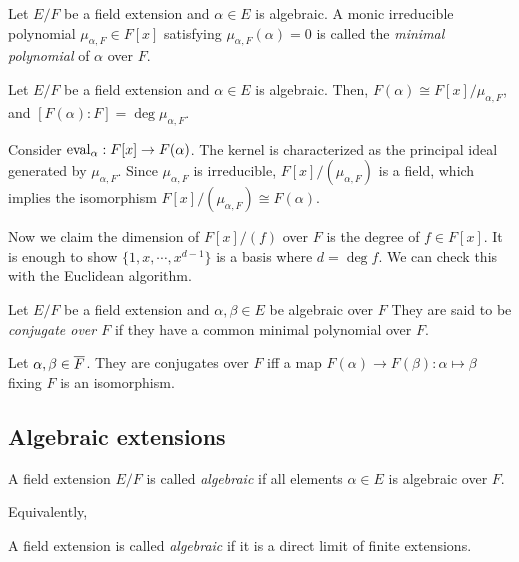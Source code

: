 \documentclass{../exp}
\begin{document}
\begin{defn}
Let $E/F$ be a field extension and $\alpha\in E$ is algebraic.
A monic irreducible polynomial $\mu_{\alpha,F}\in F[x]$ satisfying $\mu_{\alpha,F}(\alpha)=0$ is called the \emph{minimal polynomial} of $\alpha$ over $F$.
\end{defn}

\begin{thm}
Let $E/F$ be a field extension and $\alpha\in E$ is algebraic.
Then, $F(\alpha)\cong F[x]/\mu_{\alpha,F}$, and $[F(\alpha):F]=\deg\mu_{\alpha,F}$.
\end{thm}
\begin{pf}
Consider $\eval_\alpha:F[x]\to F(\alpha)$.
The kernel is characterized as the principal ideal generated by $\mu_{\alpha,F}$.
Since $\mu_{\alpha,F}$ is irreducible, $F[x]/(\mu_{\alpha,F})$ is a field, which implies the isomorphism $F[x]/(\mu_{\alpha,F})\cong F(\alpha)$.

Now we claim the dimension of $F[x]/(f)$ over $F$ is the degree of $f\in F[x]$.
It is enough to show $\{1,x,\cdots,x^{d-1}\}$ is a basis where $d=\deg f$.
We can check this with the Euclidean algorithm.
\end{pf}


\begin{defn}
Let $E/F$ be a field extension and $\alpha,\beta\in E$ be algebraic over $F$
They are said to be \emph{conjugate over $F$} if they have a common minimal polynomial over $F$.
\end{defn}

\begin{thm}
Let  $\alpha,\beta\in\overline F$.
They are conjugates over $F$ iff a map $F(\alpha)\to F(\beta):\alpha\mapsto\beta$ fixing $F$ is an isomorphism.
\end{thm}
\begin{pf}
\end{pf}






\subsection{Algebraic extensions}

\begin{defn}
A field extension $E/F$ is called \emph{algebraic} if all elements $\alpha\in E$ is algebraic over $F$.
\end{defn}

Equivalently,
\begin{defn}
A field extension is called \emph{algebraic} if it is a direct limit of finite extensions.
\end{defn}
\end{document}
